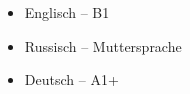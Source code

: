 




\begin{itemize}
	\item Englisch -- B1
	\item Russisch -- Muttersprache
    \item Deutsch -- A1+
\end{itemize}

